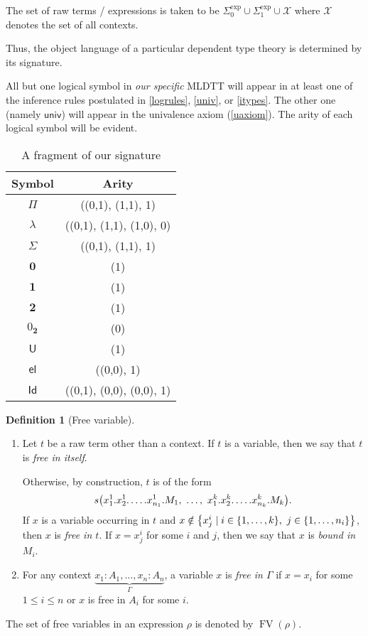 \documentclass[10pt,letterpaper,cm]{nupset}
\theoremstyle{definition}
\newtheorem{definition}{Definition}[subsection]
\theoremstyle{theorem}
\theoremstyle{remark}
\newcommand{\id}{\mathsf{Id}}
\newcommand{\U}{\mathsf{U}}
\newcommand{\el}{\mathsf{el}}
\newcommand{\univv}{\mathsf{univ}}
\newcommand{\0}{\mathbf{0}}
\newcommand{\1}{\mathbf{1}}
\newcommand{\2}{\mathbf{2}}
\DeclareMathOperator{\fv}{FV}
\DeclareMathOperator{\expr}{exp}
\newcommand{\be}{\begin{enumerate}}
\newcommand{\ee}{\end{enumerate}}
\begin{document}
\medskip
The set of raw terms / expressions is taken to be $\Sigma_0^{\expr} \cup \Sigma_1^{\expr} \cup \mathcal{X}$ where $\mathcal{X}$ denotes the set of all contexts. 

\medskip

 Thus, the object language of a particular dependent type theory is determined by its signature. 
 \smallskip
 
 All but one logical symbol in \emph{our specific} MLDTT will appear in at least one of the inference rules postulated in \cref{logrules}, \cref{univ}, or \cref{itypes}. The other one (namely $\univv$) will appear in the univalence axiom (\cref{uaxiom}). The arity of each logical symbol will be evident. 

\begin{table}[h!]
\centering
\caption{A fragment of our signature}
\label{table:1}
\begin{tabular}{||c c||} 
 \hline
Symbol & Arity \\ [0.5ex] 
 \hline\hline
 $\Pi$ & ((0,1), (1,1), 1) \\
 $ \lambda$ &  ((0,1), (1,1), (1,0), 0) \\
  $\Sigma$ & ((0,1), (1,1), 1) \\
   $\0$ & (1) \\
 $\1$ & (1) \\ 
  $\2$ & (1) \\ 
   $0_{\2}$ & (0) \\  
 $\U$ & (1) \\ 
 $\el$ & ((0,0), 1) \\
 $\id$ & ((0,1), (0,0), (0,0), 1) \\ [1ex] 
 \hline
\end{tabular}
\end{table}

\begin{definition}[Free variable] $ $
\be
\item Let $t$ be a raw term other than a context. If $t$ is a variable, then we say that $t$ is \textit{free in itself}. 

Otherwise, by construction, $t$ is of the form  $$s\mleft(x^1_1.x^1_2.\ldots.x^1_{n_1}.M_{1},\ \ldots,\  x^k_1.x^k_2.\ldots.x^k_{n_k}.M_{k}\mright)  .$$  If $x$ is a variable occurring in $t$ and $x\notin \mleft\{x_j^i \mid i\in \{1, \ldots, k\},\ j\in \{1, \ldots, n_i\}\mright\}$, then $x$ is \textit{free in $t$}. 
If $x = x_j^i$ for some $i$ and $j$, then we say that $x$ is \textit{bound in $M_i$}.
\item For any context $\underbrace{x_1:A_1, \ldots, x_n :A_n}_{\Gamma}$, a variable $x$ is \textit{free in $\Gamma$} if  $x= x_i$ for some $1\leq i \leq n$ or $x$ is free in $A_i$ for some $i$.
\ee
The set of free variables in an expression $\rho$ is denoted by $\fv(\rho)$.
\end{definition}
\end{document}
